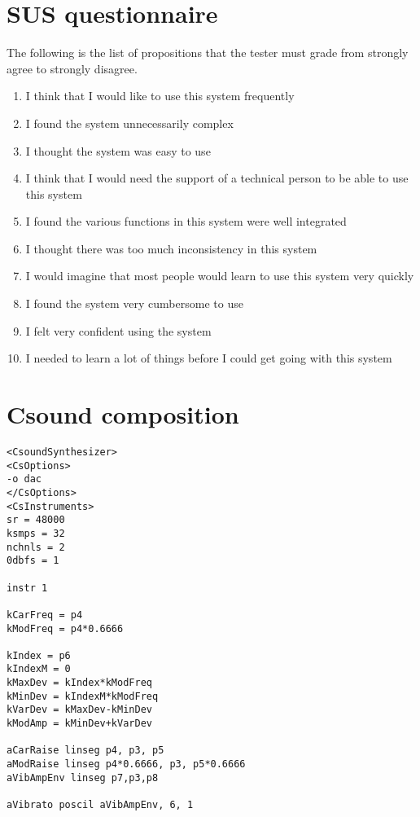 \begin{appendices}

\chapter{SUS questionnaire}

The following is the list of propositions that the tester must grade
from strongly agree to strongly disagree.

\begin{enumerate}
\tightlist
\item
  I think that I would like to use this system frequently
\item
  I found the system unnecessarily complex
\item
  I thought the system was easy to use
\item
  I think that I would need the support of a technical person to be able
  to use this system
\item
  I found the various functions in this system were well integrated
\item
  I thought there was too much inconsistency in this system
\item
  I would imagine that most people would learn to use this system very
  quickly
\item
  I found the system very cumbersome to use
\item
  I felt very confident using the system
\item
  I needed to learn a lot of things before I could get going with this
  system
\end{enumerate}

\chapter{Csound composition}

\begin{verbatim}
<CsoundSynthesizer>
<CsOptions>
-o dac
</CsOptions>
<CsInstruments>
sr = 48000
ksmps = 32
nchnls = 2
0dbfs = 1

instr 1

kCarFreq = p4
kModFreq = p4*0.6666

kIndex = p6 
kIndexM = 0
kMaxDev = kIndex*kModFreq
kMinDev = kIndexM*kModFreq
kVarDev = kMaxDev-kMinDev
kModAmp = kMinDev+kVarDev

aCarRaise linseg p4, p3, p5
aModRaise linseg p4*0.6666, p3, p5*0.6666
aVibAmpEnv linseg p7,p3,p8

aVibrato poscil aVibAmpEnv, 6, 1


\end{verbatim}
\end{appendices}
